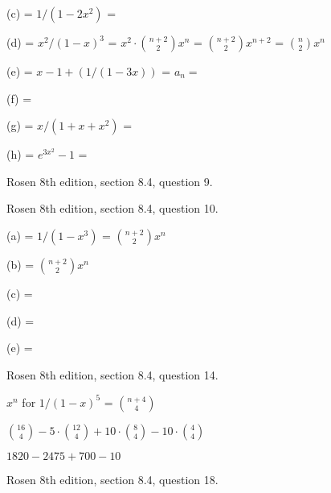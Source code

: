 (c) = $1/(1-2x^2)$ = 

(d) = $x^2/(1-x)^3$ = $x^2 \cdot \binom{n+2}{2}x^n$ = $\binom{n+2}{2}x^{n+2}$ = $\binom{n}{2}x^n$

(e) = $x-1+(1/(1-3x))$ = $a_n = $

(f) = 

(g) = $x/(1+x+x^2)$ = 

(h) = $e^{3x^2} - 1$ = 


\newpage
\nextq Rosen 8th edition, section 8.4, question 9.

\SOLUTION



\newpage
\nextq Rosen 8th edition, section 8.4, question 10.

\SOLUTION

(a) = $1/(1-x^3)$ = $\binom{n+2}{2}x^n$

(b) = $\binom{n+2}{2}x^n$

(c) = 

(d) = 

(e) = 



\newpage
\nextq Rosen 8th edition, section 8.4, question 14.

\SOLUTION

$x^n$ for $1/(1-x)^5$ = $ \binom{n+4}{4}$

$\binom{16}{4} - 5 \cdot \binom{12}{4} + 10 \cdot \binom{8}{4} - 10 \cdot \binom{4}{4}$

$1820-2475+700-10$



\newpage
\nextq Rosen 8th edition, section 8.4, question 18.


